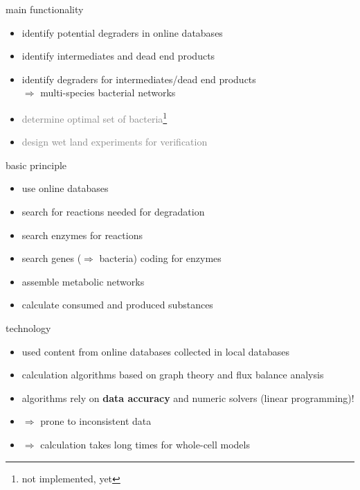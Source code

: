 \documentclass[style=aggie]{powerdot}
\begin{document}
\begin{slide}{main functionality}
\begin{itemize}
 \item identify potential degraders in online databases\newline\pause
 \item identify intermediates and dead end products\newline\pause
 \item identify degraders for intermediates/dead end products\newline\pause \\
 \indent $\Rightarrow$ multi-species bacterial networks\newline\pause
 \item \textcolor{gray}{determine optimal set of bacteria\footnote{not implemented, yet}}\newline\pause
 \item \textcolor{gray}{design wet land experiments for verification\footnotemark[1]}
\end{itemize}

\end{slide}

\begin{slide}{basic principle}
\begin{itemize}
 \item use online databases\newline\pause
 \item search for reactions needed for degradation\newline\pause
 \item search enzymes for reactions\newline\pause
 \item search genes ($\Rightarrow$ bacteria) coding for enzymes\newline\pause
 \item assemble metabolic networks\newline\pause
 \item calculate consumed and produced substances
\end{itemize}
\end{slide}

\begin{slide}{technology}
\begin{itemize}
 \item used content from online databases collected in local databases\newline\pause
 \item calculation algorithms based on graph theory and flux balance analysis\newline\pause
 \item algorithms rely on \textbf{data accuracy} and numeric solvers (linear programming)!\newline\pause
 \item $\Rightarrow$ prone to inconsistent data\newline\pause
 \item $\Rightarrow$ calculation takes long times for whole-cell models
\end{itemize}
\end{slide}
\end{document}
